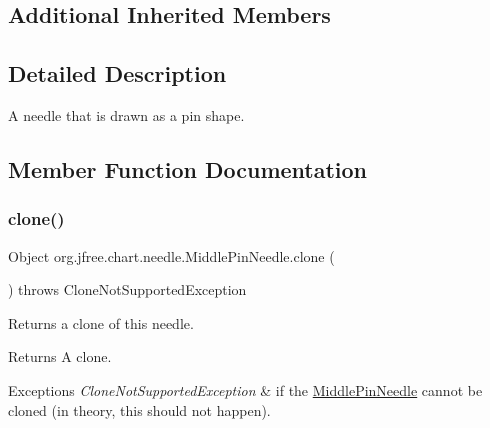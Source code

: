 \subsection*{Additional Inherited Members}


\subsection{Detailed Description}
A needle that is drawn as a pin shape. 

\subsection{Member Function Documentation}
\mbox{\label{classorg_1_1jfree_1_1chart_1_1needle_1_1_middle_pin_needle_a22c0066ff1fe4f240a900ad586862e06}} 
\subsubsection{\texorpdfstring{clone()}{clone()}}
{\footnotesize\ttfamily Object org.\+jfree.\+chart.\+needle.\+Middle\+Pin\+Needle.\+clone (\begin{DoxyParamCaption}{ }\end{DoxyParamCaption}) throws Clone\+Not\+Supported\+Exception}

Returns a clone of this needle.

\begin{DoxyReturn}{Returns}
A clone.
\end{DoxyReturn}

\begin{DoxyExceptions}{Exceptions}
{\em Clone\+Not\+Supported\+Exception} & if the {\ttfamily \mbox{\hyperlink{classorg_1_1jfree_1_1chart_1_1needle_1_1_middle_pin_needle}{Middle\+Pin\+Needle}}} cannot be cloned (in theory, this should not happen). \\
\hline
\end{DoxyExceptions}
\mbox{\label{classorg_1_1jfree_1_1chart_1_1needle_1_1_middle_pin_needle_a6f4ced6c2fca114c06dbf10e91a7e235}} 
